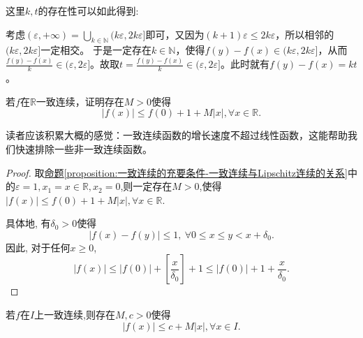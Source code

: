 \documentclass[../../main.tex]{subfiles}
\begin{document}
\begin{remark}
\hypertarget{k,t的存在性}{这里\(k,t\)的存在性可以如此得到:}考虑\((\varepsilon,+\infty)=\bigcup_{k\in \mathbb{N}}{(k\varepsilon,2k\varepsilon]}\)即可，又因为\((k + 1)\varepsilon\leqslant 2k\varepsilon\)，所以相邻的\((k\varepsilon,2k\varepsilon]\)一定相交。
于是一定存在\(k\in \mathbb{N}\)，使得\(f(y) - f(x)\in (k\varepsilon,2k\varepsilon]\)，从而\(\frac{f(y) - f(x)}{k}\in (\varepsilon,2\varepsilon]\)。故取\(t = \frac{f(y) - f(x)}{k}\in (\varepsilon,2\varepsilon]\)。此时就有\(f(y) - f(x) = kt\)。 
\end{remark}

\begin{corollary}[一致连续函数被线性函数控制]\label{corollary:一致连续函数被线性函数控制}
若\(f\)在\(\mathbb{R}\)一致连续，证明存在\(M>0\)使得
\[
|f(x)|\leqslant f(0) + 1 + M|x|,\forall x\in\mathbb{R}.
\]
\end{corollary}
\begin{note}
读者应该积累大概的感觉：一致连续函数的增长速度不超过线性函数，这能帮助我们快速排除一些非一致连续函数。
\end{note}
\begin{proof}
取\hyperref[proposition:一致连续的充要条件-一致连续与Lipschitz连续的关系]{命题\ref{proposition:一致连续的充要条件-一致连续与Lipschitz连续的关系}}中的$\varepsilon=1,x_1=x\in \mathbb{R},x_2=0$,则一定存在$M>0$,使得\(
|f(x)|\leqslant f(0) + 1 + M|x|,\forall x\in\mathbb{R}\).

具体地, 有$\delta_0 > 0$使得
\[
| f(x) - f(y) |\leq 1,\ \forall 0 \leq x \leq y < x + \delta_0.
\]
因此, 对于任何$x \geq 0$,
\[
| f(x) |\leq | f(0) | + \left[ \frac{x}{\delta_0} \right] + 1 \leq | f(0) | + 1 + \frac{x}{\delta_0}.
\]
\end{proof}

\begin{corollary}\label{corollary:一致连续函数被线性函数控制1}
若\(f\)在$I$上一致连续,则存在\(M,c>0\)使得
\[
|f(x)|\leqslant c + M|x|,\forall x\in I.
\]
\end{corollary}
\end{document}

